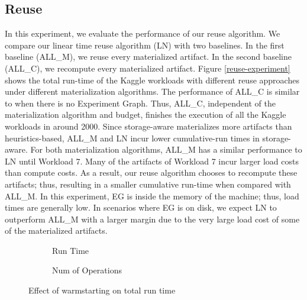 \subsection{Reuse}
In this experiment, we evaluate the performance of our reuse algorithm.
We compare our linear time reuse algorithm (LN) with two baselines.
In the first baseline (ALL\_M), we reuse every materialized artifact.
In the second baseline (ALL\_C), we recompute every materialized artifact.
Figure \ref{reuse-experiment} shows the total run-time of the Kaggle workloads with different reuse approaches under different materialization algorithms.
The performance of ALL\_C is similar to when there is no Experiment Graph.
Thus, ALL\_C, independent of the materialization algorithm and budget, finishes the execution of all the Kaggle workloads in around 2000.
Since storage-aware materializes more artifacts than heuristics-based, ALL\_M and LN incur lower cumulative-run times in storage-aware.
For both materialization algorithms, ALL\_M has a similar performance to LN until Workload 7.
Many of the artifacts of Workload 7 incur larger load costs than compute costs.
As a result, our reuse algorithm chooses to recompute these artifacts; thus, resulting in a smaller cumulative run-time when compared with ALL\_M.
In this experiment, EG is inside the memory of the machine; thus, load times are generally low.
In scenarios where EG is on disk, we expect LN to outperform ALL\_M with a larger margin due to the very large load cost of some of the materialized artifacts.
\begin{figure}[h]
\begin{subfigure}[b]{0.5\linewidth}
\centering
 \resizebox{\columnwidth}{!}{%
%
}
\caption{Run Time}
\end{subfigure}%
\begin{subfigure}[b]{0.5\linewidth}
\centering
 \resizebox{\columnwidth}{!}{%
%
}
\caption{Num of Operations}
\end{subfigure}
\caption{Effect of warmstarting on total run time}
\label{exp-model-warmstarting}
\vspace{-4mm}
\end{figure}
